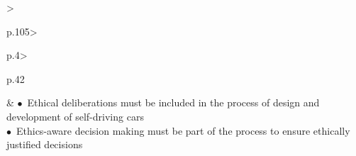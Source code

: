 \begin{table}[t]
\begin{small}
\begin{supertabular}{%
		>{\raggedright}p{.105\textwidth}>{\raggedright}p{.4\textwidth}>{\raggedright}p{.42\textwidth}}
			& \vspace{.1cm}
				\noindent $\bullet$~Ethical deliberations must be included in the process of design and development of self-driving cars\\
				\noindent $\bullet$~Ethics-aware decision making must be part of the process to ensure ethically justified decisions
 			 \tabularnewline 
		\end{supertabular}
	\end{small}
	
\end{table}

